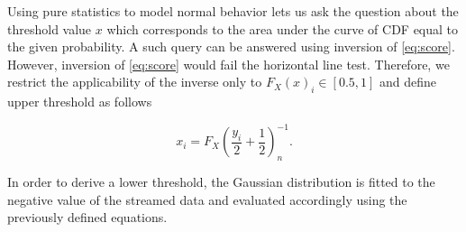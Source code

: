Using pure statistics to model normal behavior lets us ask the question about the threshold value \(x\) which corresponds to the area under the curve of CDF equal to the given probability. A such query can be answered using inversion of \eqref{eq:score}. However, inversion of \eqref{eq:score} would fail the horizontal line test. Therefore, we restrict the applicability of the inverse only to \(F_X(x)_i \in [0.5, 1]\) and define upper threshold as follows

\begin{equation}
x_i = F_X\left(\frac{y_i}{2}+\frac{1}{2}\right)^{-1}_n\text{.}\label{realthresh}
\end{equation}

In order to derive a lower threshold, the Gaussian distribution is fitted to the negative value of the streamed data and evaluated accordingly using the previously defined equations.
